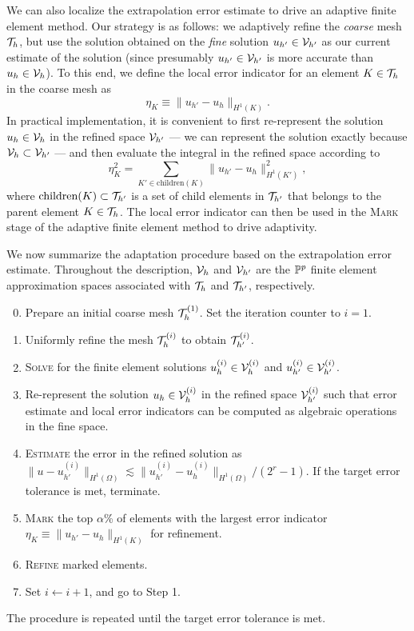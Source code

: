 We can also localize the extrapolation error estimate to drive an adaptive finite element method. Our strategy is as follows: we adaptively refine the \emph{coarse} mesh $\mathcal{T}_h$, but use the solution obtained on the \emph{fine} solution $u_{h'} \in \mathcal{V}_{h'}$ as our current estimate of the solution (since presumably $u_{h'} \in \mathcal{V}_{h'}$ is more accurate than $u_h \in \mathcal{V}_h$).  To this end, we define the local error indicator for an element $K \in \mathcal{T}_h$ in the coarse mesh as
\begin{equation*}
  \eta_K \equiv \| u_{h'} - u_h \|_{H^1(K)}.
\end{equation*}
In practical implementation, it is convenient to first re-represent the solution $u_h \in \mathcal{V}_h$ in the refined space $\mathcal{V}_{h'}$ --- we can represent the solution exactly because $\mathcal{V}_h \subset \mathcal{V}_{h'}$ --- and then evaluate the integral in the refined space according to
\begin{equation*}
  \eta_K^2 = \sum_{K' \in \text{children}(K)} \| u_{h'} - u_h \|_{H^1(K')}^2,
\end{equation*}
where $\text{children}(K) \subset \mathcal{T}_{h'}$ is a set of child elements in $\mathcal{T}_{h'}$ that belongs to the parent element $K \in \mathcal{T}_h$. The local error indicator can then be used in the \textsc{Mark} stage of the adaptive finite element method to drive adaptivity.

We now summarize the adaptation procedure based on the extrapolation error estimate. Throughout the description, $\mathcal{V}_h$ and $\mathcal{V}_{h'}$ are the $\mathbb{P}^p$ finite element approximation spaces associated with $\mathcal{T}_h$ and $\mathcal{T}_{h'}$, respectively. 
\begin{enumerate}
  \setcounter{enumi}{-1}
\item Prepare an initial coarse mesh $\mathcal{T}_h^{(1)}$.  Set the iteration counter to $i = 1$.
\item Uniformly refine the mesh $\mathcal{T}_h^{(i)}$ to obtain $\mathcal{T}_{h'}^{(i)}$.
\item \textsc{Solve} for the finite element solutions $u_h^{(i)} \in \mathcal{V}_h^{(i)}$ and $u_{h'}^{(i)} \in \mathcal{V}_{h'}^{(i)}$.
\item Re-represent the solution $u_h \in \mathcal{V}_h^{(i)}$ in the refined space $\mathcal{V}_{h'}^{(i)}$ such that error estimate and local error indicators can be computed as algebraic operations in the fine space.
\item \textsc{Estimate} the error in the refined solution as $\| u - u_{h'}^{(i)} \|_{H^1(\Omega)} \lesssim \| u_{h'}^{(i)} - u_h^{(i)} \|_{H^1(\Omega)}/(2^r - 1)$. If the target error tolerance is met, terminate.
\item \textsc{Mark} the top $\alpha$\% of elements with the largest error indicator $\eta_K \equiv \| u_{h'} - u_h \|_{H^1(K)}$ for refinement.
\item \textsc{Refine} marked elements.
\item Set $i \leftarrow i + 1$, and go to Step 1.
\end{enumerate}
The procedure is repeated until the target error tolerance is met.

